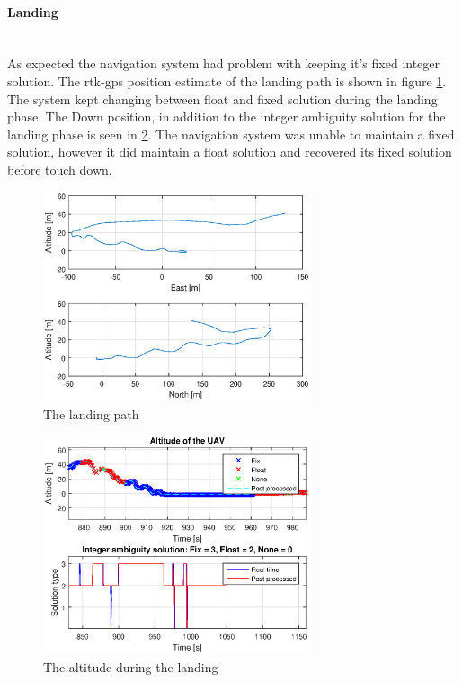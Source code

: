 \paragraph{Landing}~\\
As expected the navigation system had problem with keeping it's fixed integer solution. The \gls{rtk-gps} position estimate of the landing path is shown in figure \ref{figure:landingPath}. The system kept changing between float and fixed solution during the landing phase. The Down position, in addition to the integer ambiguity solution for the landing phase is seen in \ref{figure:landingDownFlight}. The navigation system was unable to maintain a fixed solution, however it did maintain a float solution and recovered its fixed solution before touch down.
\begin{figure}[H]
	\centering
		\includegraphics[width=0.7\textwidth]{figs/plots/landingPath.eps}
		\caption{The landing path}
		\label{figure:landingPath}
\end{figure}
\begin{figure}[H]
	\centering
		\includegraphics[width=0.7\textwidth]{figs/plots/landingDownFlight.eps}
		\caption{The altitude during the landing}
		\label{figure:landingDownFlight}
\end{figure}

